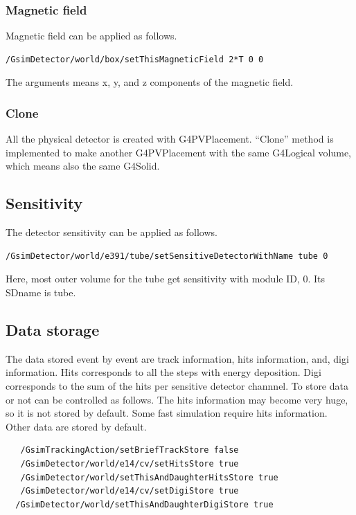 \documentclass[a4paper,12pt]{article}
\begin{document}
 \subsubsection{Magnetic field}
 Magnetic field can be applied as follows.
 \begin{screen}
  \begin{verbatim}
/GsimDetector/world/box/setThisMagneticField 2*T 0 0\end{verbatim}
 \end{screen}
 The arguments means x, y, and z components of the magnetic field.
 
\subsubsection{Clone}
All the physical detector is created with G4PVPlacement.
``Clone'' method is implemented to make another G4PVPlacement
with the same G4Logical volume, which means also the same G4Solid.

 
 \subsection{Sensitivity}
 The detector sensitivity can be applied as follows.
  \begin{screen}
   \begin{verbatim}
/GsimDetector/world/e391/tube/setSensitiveDetectorWithName tube 0\end{verbatim}
  \end{screen}
  Here, most outer volume for the tube  get sensitivity  with module ID,
  0. Its SDname is tube.

 \subsection{Data storage}
 The data stored event by event are
 track information, hits information, and, digi information.
 Hits corresponds to all the steps with energy deposition.
 Digi corresponds to the sum of the hits per sensitive detector
 channnel. To store data or not can be controlled as follows.
 The hits information may become very huge, so it is not stored by
 default. Some fast simulation require hits information. Other data
 are stored by default.
 \begin{screen}
   \begin{verbatim}
   /GsimTrackingAction/setBriefTrackStore false
   /GsimDetector/world/e14/cv/setHitsStore true
   /GsimDetector/world/setThisAndDaughterHitsStore true
   /GsimDetector/world/e14/cv/setDigiStore true
  /GsimDetector/world/setThisAndDaughterDigiStore true\end{verbatim}
  \end{screen}
  
\end{document}
